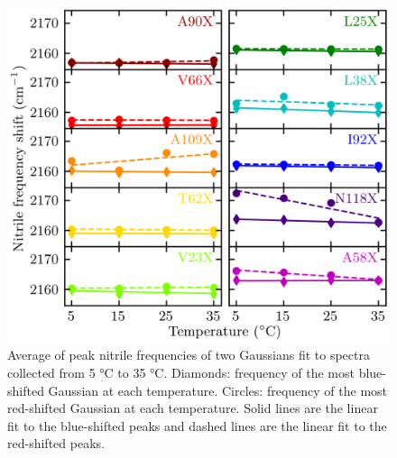 \begin{figure}
    \center
    \includegraphics[width=\single]{figures-snase/ftls_both_gaussians.png}
    \caption[Independent FTLS from component populations of nitrile spectra]{
        Average of peak nitrile frequencies of two Gaussians fit to spectra collected from 5 \si{\celsius} to 35 \si{\celsius}. 
        Diamonds: frequency of the most blue-shifted Gaussian at each temperature. 
        Circles: frequency of the most red-shifted Gaussian at each temperature. 
        Solid lines are the linear fit to the blue-shifted peaks and dashed lines are the linear fit to the red-shifted peaks.
    }
    \label{fig:snase-independent_ftls}
\end{figure}

